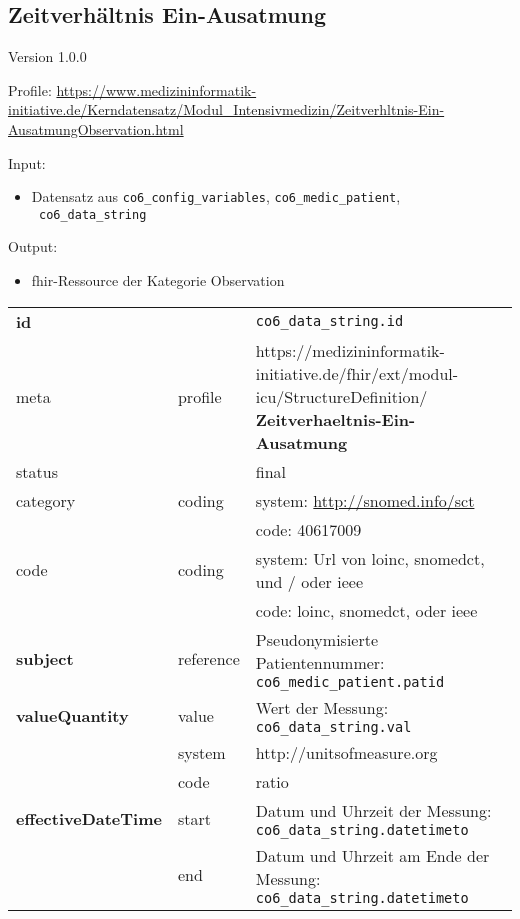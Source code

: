 \subsection{Zeitverhältnis Ein-Ausatmung} 
\noindent Version 1.0.0

\noindent Profile: \url{https://www.medizininformatik-initiative.de/Kerndatensatz/Modul_Intensivmedizin/Zeitverhltnis-Ein-AusatmungObservation.html}

\noindent Input:
\begin{itemize}
	\item Datensatz aus \texttt{co6\_config\_variables}, \texttt{co6\_medic\_patient}, \\ \texttt{
co6\_data\_string}
\end{itemize}
Output:
\begin{itemize}
        \item \ac{fhir}-Ressource der Kategorie \glqq Observation\grqq{}
\end{itemize}
\begin{longtable}{|l|l|p{7.5cm}|}
        \hline
        \rowcolor{lightgray} \multicolumn{3}{|l|}{Data Mapping (inhaltlich)} \\ \hline
        \textbf{id} &  & \texttt{co6\_data\_string.id} \\ \hline
	meta & profile & https://medizininformatik-initiative.de/fhir/ext/modul-icu/StructureDefinition/\textbf{
Zeitverhaeltnis-Ein-Ausatmung} \\ \hline 
	status &  & final   \\ \hline 
	category & coding & system: \url{http://snomed.info/sct} \\
\cline{3-3}
	& & code: 40617009 \\ \hline
	code & coding & system: Url von \ac{loinc}, \ac{snomedct}, und / oder \ac{ieee} \\ 
	\cline{3-3} 
	 &  & code: \ac{loinc}, \ac{snomedct}, oder \ac{ieee} \\ \hline
	 \textbf{subject}  & reference & Pseudonymisierte Patientennummer: \texttt{co6\_medic\_patient.patid} \\ \hline
	 \textbf{valueQuantity}  & value & Wert der Messung: \texttt{
co6\_data\_string.val} \\
        \cline{2-3}
         & system & http://unitsofmeasure.org \\
         \cline{2-3}
         & code & {ratio} \\ \hline
     \textbf{effectiveDateTime}  & start & Datum und Uhrzeit der Messung: \texttt{
co6\_data\_string.datetimeto} \\
    \cline{2-3}
     & end & Datum und Uhrzeit am Ende der Messung: \texttt{
co6\_data\_string.datetimeto} \\ \hline
\end{longtable}
\clearpage

